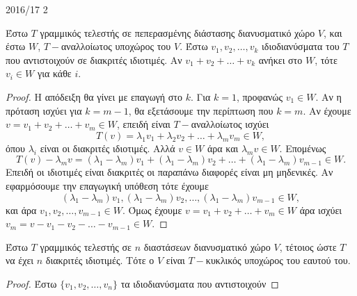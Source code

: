 \documentclass[a4paper,11pt]{article}
\begin{document}
\begin{solution}{2016/17 2}
    \begin{lemma}\label{lemma:1617_eigenvec}
        Έστω \( T \) γραμμικός τελεστής σε πεπερασμένης διάστασης διανυσματικό χώρο
        \( V \), και έστω \( W \), \(T-\)αναλλοίωτος υποχώρος του \( V \). Έστω \(
        v_1, v_2, \dots, v_k \) ιδιοδιανύσματα του \( T \) που αντιστοιχούν σε
        διακριτές ιδιοτιμές. Αν \( v_1 + v_2 + \dots + v_k \) ανήκει στο \( W \),
        τότε \( v_i \in W \) για κάθε \( i \).
    \end{lemma}
    \begin{proof}
        Η απόδειξη θα γίνει με επαγωγή στο \( k \). Για \( k = 1 \), προφανώς \(
        v_1 \in W \). Αν η πρόταση ισχύει για \( k = m-1 \), θα εξετάσουμε την
        περίπτωση που \( k = m \). Αν έχουμε \( v = v_1 + v_2 + \dots + v_m \in
        W \), επειδή είναι \(T-\)αναλλοίωτος ισχύει
        \begin{equation*}
            T(v) = \lambda_1v_1 + \lambda_2v_2 + \dots + \lambda_mv_m \in W,
        \end{equation*}
        όπου \( \lambda_i \) είναι οι διακριτές ιδιοτιμές. Αλλά \( v \in W \)
        άρα και \( \lambda_mv \in W \). Επομένως
        \begin{equation*}
            T(v) -\lambda_mv = (\lambda_1 - \lambda_m)v_1 + (\lambda_1 - \lambda_m)v_2 + \dots +
            (\lambda_1 - \lambda_m)v_{m-1} \in W.
        \end{equation*}
        Επειδή οι ιδιοτιμές είναι διακριτές οι παραπάνω διαφορές είναι μη
        μηδενικές. Αν εφαρμόσουμε την επαγωγική υπόθεση τότε έχουμε
        \begin{equation*}
            (\lambda_1 - \lambda_m)v_1, (\lambda_1 - \lambda_m)v_2, \dots ,
            (\lambda_1 - \lambda_m)v_{m-1} \in W,
        \end{equation*}
        και άρα \( v_1, v_2, \dots, v_{m-1} \in W \). Όμως έχουμε \( v = v_1 + v_2 + \dots + v_m \in
        W \) άρα ισχύει \( v_m = v - v_1 - v_2 - \dots - v_{m-1} \in W \).
    \end{proof}
    \begin{lemma}\label{lemma:1617_cyclic}
        Έστω \( T \) γραμμικός τελεστής σε \(n\) διαστάσεων διανυσματικό χώρο
        \( V \), τέτοιος ώστε \( T \) να έχει \( n \) διακριτές ιδιοτιμές. Τότε
        ο \( V \) είναι \(T-\)κυκλικός υποχώρος του εαυτού του.
    \end{lemma}
    \begin{proof}
        Έστω \( \{v_1, v_2, \dots, v_n\} \) τα ιδιοδιανύσματα που αντιστοιχούν

\end{proof}
\end{solution}
\end{document}
